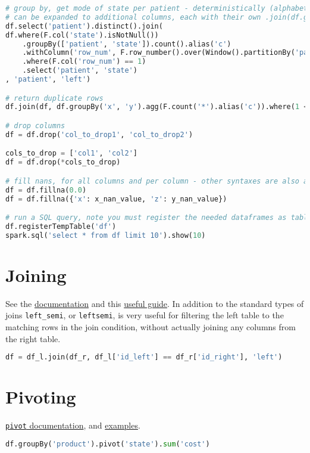 \begin{lstlisting}[language=Python]
# group by, get mode of state per patient - deterministically (alphabetical order)
# can be expanded to additional columns, each with their own .join(df.groupBy()...) statements
df.select('patient').distinct().join(
df.where(F.col('state').isNotNull())
	.groupBy(['patient', 'state']).count().alias('c')
	.withColumn('row_num', F.row_number().over(Window().partitionBy('patient').orderBy(F.col('c').desc(), F.col('state'))))
	.where(F.col('row_num') == 1)
	.select('patient', 'state')
, 'patient', 'left')

# return duplicate rows
df.join(df, df.groupBy('x', 'y').agg(F.count('*').alias('c')).where(1 < F.('c')), ['x', 'y'], 'left_semi')

# drop columns
df = df.drop('col_to_drop1', 'col_to_drop2')

cols_to_drop = ['col1', 'col2']
df = df.drop(*cols_to_drop)

# fill nans, for all columns and per column - other syntaxes are also available
df = df.fillna(0.0)
df = df.fillna({'x': x_nan_value, 'z': y_nan_value})

# run a SQL query, note you must register the needed dataframes as tables first
df.registerTempTable('df')
spark.sql('select * from df limit 10').show(10)
\end{lstlisting}

\section{Joining}
\label{pyspark:join}

\noindent See the \href{http://spark.apache.org/docs/2.1.0/api/python/pyspark.sql.html?highlight=join#pyspark.sql.DataFrame.join}{documentation} and this \href{http://www.learnbymarketing.com/1100/pyspark-joins-by-example/}{useful guide}. In addition to the standard types of joins \texttt{left\_semi}, or \texttt{leftsemi}, is very useful for filtering the left table to the matching rows in the join condition, without actually joining any columns from the right table.

\begin{lstlisting}[language=Python]
df = df_l.join(df_r, df_l['id_left'] == df_r['id_right'], 'left')
\end{lstlisting}

\section{Pivoting}
\label{pyspark:pivoting}

\noindent \href{https://spark.apache.org/docs/2.1.0/api/python/pyspark.sql.html?highlight=pivot#pyspark.sql.GroupedData.pivot}{\texttt{pivot} documentation}, and \href{https://sparkbyexamples.com/pyspark/pyspark-pivot-and-unpivot-dataframe/}{examples}.

\begin{lstlisting}[language=Python]
df.groupBy('product').pivot('state').sum('cost')
\end{lstlisting}
